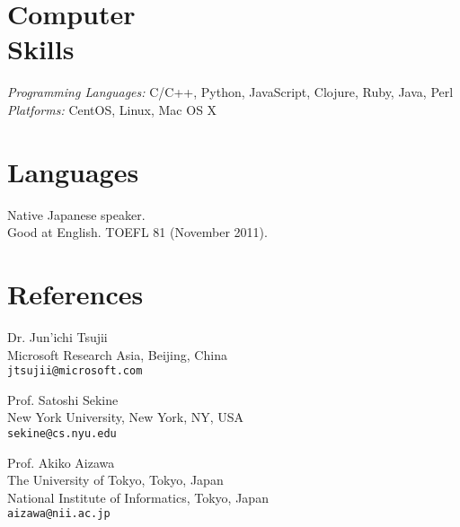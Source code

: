 \documentclass[margin]{res}
\begin{document}
\begin{resume}

\section{Computer \\ Skills}
\textit{Programming Languages:} C/C++, Python, JavaScript, Clojure, Ruby, Java, Perl \\
\textit{Platforms:} CentOS, Linux, Mac OS X\\

\section{Languages}
Native Japanese speaker.\\
Good at English. TOEFL 81 (November 2011). \\

\section{References} 
Dr. Jun'ichi Tsujii \\
Microsoft Research Asia, Beijing, China\\
{\tt jtsujii@microsoft.com}

Prof. Satoshi Sekine \\
New York University, New York, NY, USA\\
{\tt sekine@cs.nyu.edu}

Prof. Akiko Aizawa \\
The University of Tokyo, Tokyo, Japan\\
National Institute of Informatics, Tokyo, Japan\\
{\tt aizawa@nii.ac.jp}

\end{resume}
\end{document}
